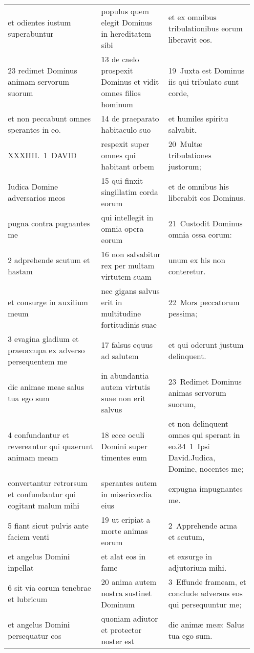 \documentclass{article}
\begin{document}
\begin{longtable}{@{}p{}p{}p{}@{}}
et odientes iustum superabuntur	&	populus quem elegit Dominus in hereditatem sibi	&	et ex omnibus tribulationibus eorum liberavit eos.	\\
23 redimet Dominus animam servorum suorum	&	13 de caelo prospexit Dominus et vidit omnes filios hominum	&	19 Juxta est Dominus iis qui tribulato sunt corde,	\\
et non peccabunt omnes sperantes in eo.	&	14 de praeparato habitaculo suo	&	et humiles spiritu salvabit.	\\
XXXIIII. 1 DAVID	&	respexit super omnes qui habitant orbem	&	20 Multæ tribulationes justorum;	\\
Iudica Domine adversarios meos	&	15 qui finxit singillatim corda eorum	&	et de omnibus his liberabit eos Dominus.	\\
pugna contra pugnantes me	&	qui intellegit in omnia opera eorum	&	21 Custodit Dominus omnia ossa eorum:	\\
2 adprehende scutum et hastam	&	16 non salvabitur rex per multam virtutem suam	&	unum ex his non conteretur.	\\
et consurge in auxilium meum	&	nec gigans salvus erit in multitudine fortitudinis suae	&	22 Mors peccatorum pessima;	\\
3 evagina gladium et praeoccupa ex adverso persequentem me	&	17 falsus equus ad salutem	&	et qui oderunt justum delinquent.	\\
dic animae meae salus tua ego sum	&	in abundantia autem virtutis suae non erit salvus	&	23 Redimet Dominus animas servorum suorum,	\\
4 confundantur et revereantur qui quaerunt animam meam	&	18 ecce oculi Domini super timentes eum	&	et non delinquent omnes qui sperant in eo.34 1 Ipsi David.Judica, Domine, nocentes me;	\\
convertantur retrorsum et confundantur qui cogitant malum mihi	&	sperantes autem in misericordia eius	&	expugna impugnantes me.	\\
5 fiant sicut pulvis ante faciem venti	&	19 ut eripiat a morte animas eorum	&	2 Apprehende arma et scutum,	\\
et angelus Domini inpellat	&	et alat eos in fame	&	et exsurge in adjutorium mihi.	\\
6 sit via eorum tenebrae et lubricum	&	20 anima autem nostra sustinet Dominum	&	3 Effunde frameam, et conclude adversus eos qui persequuntur me;	\\
et angelus Domini persequatur eos	&	quoniam adiutor et protector noster est	&	dic animæ meæ: Salus tua ego sum.	\\

\end{longtable}
\end{document}
